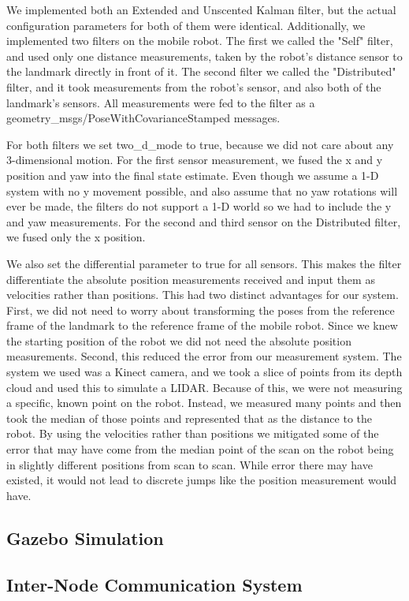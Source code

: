\documentclass[conference]{IEEEtran}
\begin{document}
We implemented both an Extended and Unscented Kalman filter, but the actual configuration parameters for both of them 
were identical. Additionally, we implemented two filters on the mobile robot. The first we called the "Self" filter, 
and used only one distance measurements, taken by the robot's distance sensor to the landmark directly in front of it. 
The second filter we called the "Distributed" filter, and it took measurements from the robot's sensor, and also both 
of the landmark's sensors. All measurements were fed to the filter as a geometry\_msgs/PoseWithCovarianceStamped 
messages.

For both filters we set two\_d\_mode to true, because we did not care about any 3-dimensional motion. For the first 
sensor measurement, we fused the x and y position and yaw into the final state estimate. Even though we assume a 1-D 
system with no y movement possible, and also assume that no yaw rotations will ever be made, the filters do not support 
a 1-D world so we had to include the y and yaw measurements. For the second and third sensor on the Distributed filter, 
we fused only the x position.

We also set the differential parameter to true for all sensors. This makes the filter differentiate the absolute 
position measurements received and input them as velocities rather than positions. This had two distinct advantages for 
our system. First, we did not need to worry about transforming the poses from the reference frame of the landmark to 
the reference frame of the mobile robot. Since we knew the starting position of the robot we did not need the absolute 
position measurements. Second, this reduced the error from our measurement system. The system we used was a Kinect 
camera, and we took a slice of points from its depth cloud and used this to simulate a LIDAR. Because of this, we were 
not measuring a specific, known point on the robot. Instead, we measured many points and then took the median of those 
points and represented that as the distance to the robot. By using the velocities rather than positions we mitigated 
some of the error that may have come from the median point of the scan on the robot being in slightly different 
positions from scan to scan. While error there may have existed, it would not lead to discrete jumps like the position 
measurement would have.
\subsection{Gazebo Simulation}
\subsection{Inter-Node Communication System}
\end{document}

